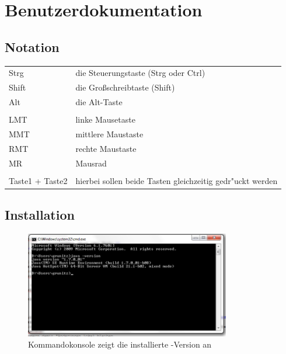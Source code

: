 \chapter{Benutzerdokumentation}


\section{Notation}

\begin{tabular}{l|l}
	Strg & die Steuerungstaste (Strg oder Ctrl) \\
	Shift & die Gro\ss schreibtaste (Shift) \\
	Alt & die Alt-Taste \\
	\\
	LMT & linke Mausetaste \\
	MMT & mittlere Maustaste \\
	RMT & rechte Maustaste \\
	MR & Mausrad\\
	\\
	Taste1 + Taste2 & hierbei sollen beide Tasten gleichzeitig gedr"uckt werden \\
\end{tabular}

\section{Installation}

\begin{figure}[htb]
\centering
\includegraphics[width=0.8\textwidth]{bilder/java_version.png}
\caption{Kommandokonsole zeigt die installierte \javaNS-Version an}
\label{pic:java_version}
\end{figure}

